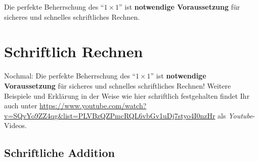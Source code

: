 \documentclass[a4paper]{book}%
\def\mcr{\pgfmatrixcurrentrow}\def\mcc{\pgfmatrixcurrentcolumn}
\theoremstyle{definition}
\begin{document}

Die perfekte Beherrschung des \enquote{$1 \times 1$} ist \textbf{notwendige Voraussetzung} für sicheres und schnelles schriftliches Rechnen.

\chapter{Schriftlich Rechnen}

Nochmal: Die perfekte Beherrschung des \enquote{$1 \times 1$} ist \textbf{notwendige Voraussetzung} für sicheres und schnelles schriftliches Rechnen! Weitere Beispiele und Erklärung in der Weise wie hier schriftlich festgehalten findet Ihr auch unter \url{https://www.youtube.com/watch?v=SQvYo9ZZ4qg&list=PLVBzQZPmcRQL6vbGv1uDj7styo4I0nzHr} als \textit{Youtube}-Videos.


\section{Schriftliche Addition}
\end{document}
